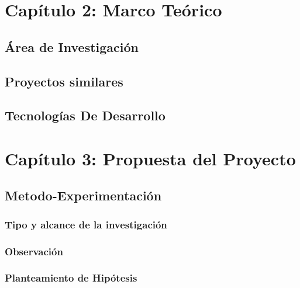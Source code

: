 \documentclass{extbook}
\begin{document}


\tableofcontents
\listoffigures
\listoftables

\chapter{Capítulo 2: Marco Teórico}
\section{Área de Investigación}






\section{Proyectos similares}

\section{Tecnologías De Desarrollo}


\chapter{Capítulo 3: Propuesta del Proyecto}
\section{Metodo-Experimentación}
\subsection{Tipo y alcance de la investigación}

\subsection{Observación}

\subsection{Planteamiento de Hipótesis}

\end{document}
